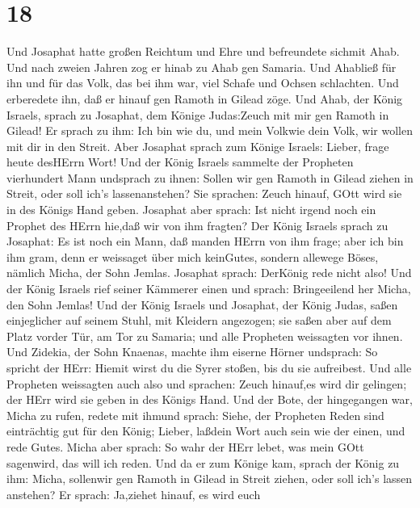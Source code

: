 \hypertarget{section-17}{%
\section{18}\label{section-17}}

 Und Josaphat hatte großen Reichtum und Ehre und befreundete
sichmit Ahab.  Und nach zweien Jahren zog er hinab zu Ahab
gen Samaria. Und Ahabließ für ihn und für das Volk, das bei ihm war,
viel Schafe und Ochsen schlachten. Und erberedete ihn, daß er hinauf gen
Ramoth in Gilead zöge.  Und Ahab, der König Israels, sprach
zu Josaphat, dem Könige Judas:Zeuch mit mir gen Ramoth in Gilead! Er
sprach zu ihm: Ich bin wie du, und mein Volkwie dein Volk, wir wollen
mit dir in den Streit.  Aber Josaphat sprach zum Könige
Israels: Lieber, frage heute desHErrn Wort!  Und der König
Israels sammelte der Propheten vierhundert Mann undsprach zu ihnen:
Sollen wir gen Ramoth in Gilead ziehen in Streit, oder soll ich's
lassenanstehen? Sie sprachen: Zeuch hinauf, GOtt wird sie in des Königs
Hand geben.  Josaphat aber sprach: Ist nicht irgend noch ein
Prophet des HErrn hie,daß wir von ihm fragten?  Der König
Israels sprach zu Josaphat: Es ist noch ein Mann, daß manden HErrn von
ihm frage; aber ich bin ihm gram, denn er weissaget über mich keinGutes,
sondern allewege Böses, nämlich Micha, der Sohn Jemlas. Josaphat sprach:
DerKönig rede nicht also!  Und der König Israels rief seiner
Kämmerer einen und sprach: Bringeeilend her Micha, den Sohn Jemlas!
 Und der König Israels und Josaphat, der König Judas, saßen
einjeglicher auf seinem Stuhl, mit Kleidern angezogen; sie saßen aber
auf dem Platz vorder Tür, am Tor zu Samaria; und alle Propheten
weissagten vor ihnen.  Und Zidekia, der Sohn Knaenas,
machte ihm eiserne Hörner undsprach: So spricht der HErr: Hiemit wirst
du die Syrer stoßen, bis du sie aufreibest.  Und alle
Propheten weissagten auch also und sprachen: Zeuch hinauf,es wird dir
gelingen; der HErr wird sie geben in des Königs Hand.  Und
der Bote, der hingegangen war, Micha zu rufen, redete mit ihmund sprach:
Siehe, der Propheten Reden sind einträchtig gut für den König; Lieber,
laßdein Wort auch sein wie der einen, und rede Gutes. 
Micha aber sprach: So wahr der HErr lebet, was mein GOtt sagenwird, das
will ich reden.  Und da er zum Könige kam, sprach der König
zu ihm: Micha, sollenwir gen Ramoth in Gilead in Streit ziehen, oder
soll ich's lassen anstehen? Er sprach: Ja,ziehet hinauf, es wird euch
